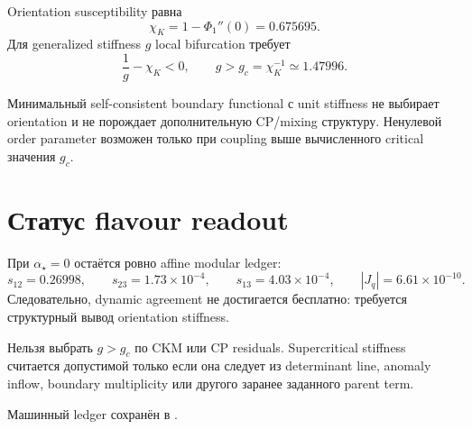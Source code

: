 Orientation susceptibility равна
\begin{equation}
 \chi_K=1-\Phi_1''(0)=0.675695.
\end{equation}
Для generalized stiffness \(g\) local bifurcation требует
\begin{equation}
 \frac1g-\chi_K<0,
 \qquad
 g>g_c=\chi_K^{-1}\simeq1.47996.
\end{equation}

\begin{theorem}
Минимальный self-consistent boundary functional с unit stiffness не выбирает
orientation и не порождает дополнительную CP/mixing структуру. Ненулевой
order parameter возможен только при coupling выше вычисленного critical
значения \(g_c\).
\end{theorem}

\section{Статус flavour readout}

При \(\alpha_\star=0\) остаётся ровно affine modular ledger:
\begin{equation}
 s_{12}=0.26998,
 \qquad s_{23}=1.73\times10^{-4},
 \qquad s_{13}=4.03\times10^{-4},
 \qquad |J_q|=6.61\times10^{-10}.
\end{equation}
Следовательно, dynamic agreement не достигается бесплатно: требуется
структурный вывод orientation stiffness.

\begin{nogocriterion}
Нельзя выбрать \(g>g_c\) по CKM или CP residuals. Supercritical stiffness
считается допустимой только если она следует из determinant line, anomaly
inflow, boundary multiplicity или другого заранее заданного parent term.
\end{nogocriterion}

Машинный ledger сохранён в
.